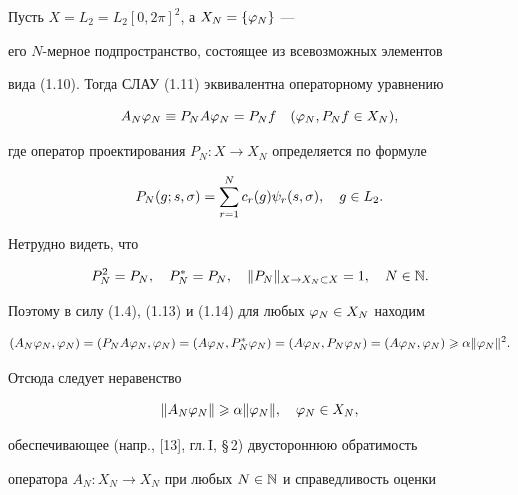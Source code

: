\begin{pf}


Пусть $X = L_2 = L_2[0,2\pi]^2$, а $X_N = \{\varphi_N\}$ --- 


его $N$-мерное подпространство, состоящее из всевозможных элементов 


вида (1.10). Тогда СЛАУ (1.11) эквивалентна операторному уравнению 


\begin{equation}


A_N\vp_N \equiv P_N A \vp_N = P_N f\quad  (\vp_N, P_N f\in X_N),


\end{equation}


где оператор проектирования $P_N:X\to X_N$ определяется по формуле


\begin{equation}


P_N(g;s,\si) = \sum_{r=1}^N c_r(g)\psi_r(s,\si),\quad g\in L_2.


\end{equation}


Нетрудно видеть, что 


\begin{equation}


P_N^2 = P_N,\quad P_N^* = P_N,\quad \|P_N\|_{X\to X_N \subset X}=1,


\quad N\in \N.


\end{equation}


Поэтому в силу (1.4), (1.13) и (1.14) для любых $\varphi_N\in X_N$ находим


\begin{equation}


(A_N\vp_N,\vp_N) = (P_NA\vp_N,\vp_N) = (A\vp_N,P_N^*\vp_N)=


(A\vp_N,P_N\vp_N) = (A\vp_N,\vp_N) \gea \alpha\|\vp_N\|^2.


\end{equation}


Отсюда следует неравенство


\begin{equation}


\|A_N\vp_N\|\gea \alpha\|\vp_N\|,\quad \vp_N \in X_N,


\end{equation}


обеспечивающее (напр., [13], гл.\,I, \S\,2) двустороннюю обратимость 


оператора $A_N:X_N\to X_N$ при любых $N\in \Bbb N$ и справедливость оценки 



\end{pf}
